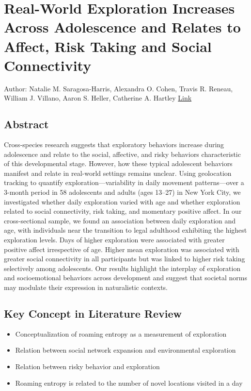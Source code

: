 \newpage
\section{Real-World Exploration Increases Across Adolescence and Relates to Affect, Risk Taking and Social Connectivity} 

Author: Natalie M. Saragosa-Harris, Alexandra O. Cohen, Travis R. Reneau, William J. Villano, Aaron S. Heller, Catherine A. Hartley 
\href{https://journals.sagepub.com/doi/10.1177/09567976221102070}{Link}

\subsection{Abstract} 
Cross-species research suggests that exploratory behaviors increase during adolescence and relate to the social, affective, and risky behaviors characteristic of this developmental stage. However, how these typical adolescent behaviors manifest and relate in real-world settings remains unclear. Using geolocation tracking to quantify exploration—variability in daily movement patterns—over a 3-month period in 58 adolescents and adults (ages 13–27) in New York City, we investigated whether daily exploration varied with age and whether exploration related to social connectivity, risk taking, and momentary positive affect. In our cross-sectional sample, we found an association between daily exploration and age, with individuals near the transition to legal adulthood exhibiting the highest exploration levels. Days of higher exploration were associated with greater positive affect irrespective of age. Higher mean exploration was associated with greater social connectivity in all participants but was linked to higher risk taking selectively among adolescents. Our results highlight the interplay of exploration and socioemotional behaviors across development and suggest that societal norms may modulate their expression in naturalistic contexts.

\subsection{Key Concept in Literature Review} 
    \begin{itemize}
        \item Conceptualization of roaming entropy as a measurement of exploration 
        \item Relation between social network expansion and environmental exploration
        \item Relation between risky behavior and exploration
        \item Roaming entropy is related to the number of novel locations visited in a day
    \end{itemize}


